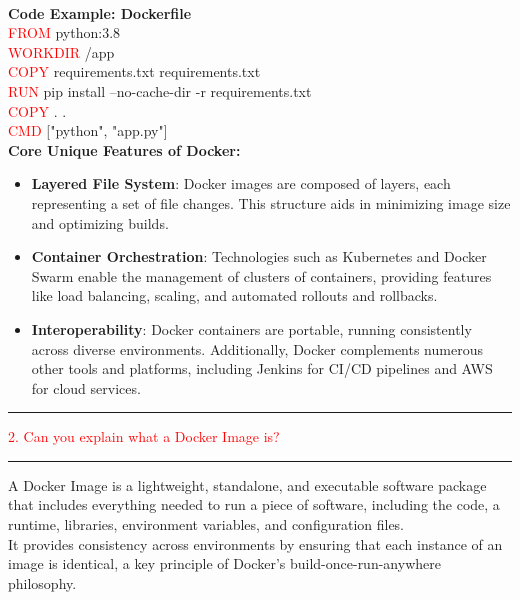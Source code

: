 \documentclass{article}
\begin{document}
\\
\textbf{Code Example: Dockerfile} \\
\textcolor{red}{FROM} python:3.8 \\
\textcolor{red}{WORKDIR} /app\\
\textcolor{red}{COPY} requirements.txt requirements.txt\\
\textcolor{red}{RUN} pip install --no-cache-dir -r requirements.txt\\
\textcolor{red}{COPY} . .\\
\textcolor{red}{CMD} ["python", "app.py"] 
\\ 
\textbf{Core Unique Features of Docker:} \\
\begin{itemize}
\color{blue}
\item \textbf{Layered File System}: Docker images are composed of layers, each representing a set of file changes. This structure aids in minimizing image size and optimizing builds.
\item \textbf{Container Orchestration}: Technologies such as Kubernetes and Docker Swarm enable the management of clusters of containers, providing features like load balancing, scaling, and automated rollouts and rollbacks.
\item \textbf{Interoperability}: Docker containers are portable, running consistently across diverse environments. Additionally, Docker complements numerous other tools and platforms, including Jenkins for CI/CD pipelines and AWS for cloud services. 
\end{itemize}
\noindent
{\color{red} \rule{\linewidth}{0.5mm}}
\textcolor{red}{2. Can you explain what a Docker Image is?} \\
\noindent
{\color{red} \rule{\linewidth}{0.5mm}}
\begin{tcolorbox}[colback=red!5!white, colframe=red!50!black,title=Docker Image]
    A Docker Image is a lightweight, standalone, and executable software package that includes everything needed to run a piece of software, including the code, a runtime, libraries, environment variables, and configuration files. \\
It provides consistency across environments by ensuring that each instance of an image is identical, a key principle of Docker's build-once-run-anywhere philosophy.
\end{tcolorbox}
\end{document}
